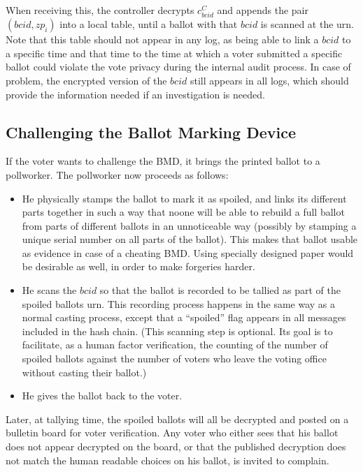 \documentclass[prodmode]{acmsmall}
\newcommand{\zp}{\ensuremath{zp}\xspace}
\newcommand{\bcid}{\ensuremath{bcid}\xspace} %
\newcommand{\bmd}{\textsf{BMD}\xspace}       %
\newcommand{\cbc}{\ensuremath{c^C_{\bcid}}\xspace} %
\begin{document}
When receiving this, the controller decrypts $\cbc$ and appends the
pair $(\bcid, \zp_i)$ into a local table, until a ballot with that \bcid
is scanned at the urn. Note that this table should not appear in any
log, as being able to link a \bcid to a specific time and that time to
the time at which a voter submitted a specific ballot could violate
the vote privacy during the internal audit process. In case of
problem, the encrypted version of the \bcid still appears in all logs,
which should provide the information needed if an investigation is needed.

\subsection{Challenging the Ballot Marking Device}
\label{sec:chall-ball-mark}

If the voter wants to challenge the \bmd, it brings the printed ballot
to a pollworker. The pollworker now proceeds as follows: 
\begin{itemize}
\item He physically stamps the ballot to mark it as spoiled, and links
  its different parts together in such a way that noone will be able
  to rebuild a full ballot from parts of different ballots in an
  unnoticeable way (possibly by stamping a unique serial number on all
  parts of the ballot). This makes that ballot usable as evidence in
  case of a cheating \bmd. Using specially designed paper would be
  desirable as well, in order to make forgeries harder. 
\item He scans the $\bcid$ so that the ballot is recorded to be tallied
  as part of the spoiled ballots urn. This recording process happens
  in the same way as a normal casting process, except that a
  ``spoiled'' flag appears in all messages included in the hash
  chain. (This scanning step is optional.  Its goal is to facilitate,
  as a human factor verification, the counting of the number of
  spoiled ballots against the number of voters who leave the voting
  office without casting their ballot.)
\item He gives the ballot back to the voter. 
\end{itemize}

Later, at tallying time, the spoiled ballots will all be decrypted and
posted on a bulletin board for voter verification. Any voter who
either sees that his ballot does not appear decrypted on the board, or
that the published decryption does not match the human readable
choices on his ballot, is invited to complain. 
\end{document}
